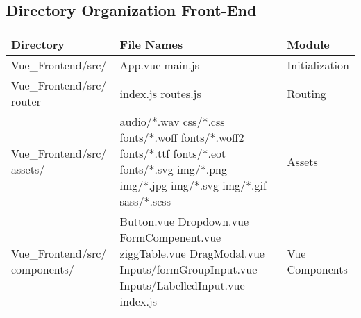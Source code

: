 \documentclass[conference]{IEEEtran}
\begin{document}
\subsection{Directory Organization Front-End}

\begin{table}[H]
\centering
\renewcommand{\arraystretch}{1.5}
\begin{tabular}{|m{2.6cm}|m{3.5cm}|>{\raggedright\arraybackslash}m{1.6cm}|}
\hline
\textbf{Directory} & \textbf{File Names} & \textbf{Module} \\ \hline

Vue\_Frontend/src/  & 
App.vue \newline
main.js & 
Initialization \\ \hline

Vue\_Frontend/src/ router & 
index.js \newline
routes.js & 
Routing \\ \hline

Vue\_Frontend/src/ assets/ & 
audio/*.wav \newline
css/*.css \newline
fonts/*.woff \newline
fonts/*.woff2 \newline
fonts/*.ttf \newline
fonts/*.eot \newline
fonts/*.svg \newline
img/*.png \newline
img/*.jpg \newline
img/*.svg \newline
img/*.gif \newline
sass/*.scss & 
Assets \\ \hline

Vue\_Frontend/src/  components/ & 
Button.vue \newline
Dropdown.vue \newline
FormCompenent.vue \newline
ziggTable.vue \newline
DragModal.vue \newline
Inputs/formGroupInput.vue \newline
Inputs/LabelledInput.vue \newline
index.js & 
Vue Components \\ \hline

\end{tabular}
\end{table}
\end{document}
